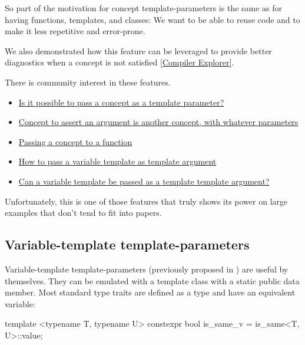\documentclass{wg21}
\begin{document}
So part of the motivation for concept template-parameters is the same as for having functions, templates, and classes:
We want to be able to reuse code and to make it less repetitive and error-prone.


We also demonstrated how this feature can be leveraged to provide better diagnostics when a concept is not satisfied \href{https://compiler-explorer.com/z/sPz5faEbP}{[Compiler Explorer]}.


There is community interest in these features.
\begin{itemize}
\item \href{https://stackoverflow.com/questions/63098070/is-it-possible-to-pass-a-concept-as-a-template-parameter}{Is it possible to pass a concept as a template parameter?}
\item \href{https://stackoverflow.com/questions/72488554/concept-to-assert-an-argument-is-another-concept-with-whatever-parameters}{Concept to assert an argument is another concept, with whatever parameters}
\item \href{https://stackoverflow.com/questions/58875829/passing-a-concept-to-a-function}{Passing a concept to a function}
\item \href{https://stackoverflow.com/questions/61664468/how-to-pass-a-variable-template-as-template-argument}{How to pass a variable template as template argument}
\item \href{https://stackoverflow.com/questions/58592312/can-a-variable-template-be-passed-as-a-template-template-argument}{Can a variable template be passed as a template template argument?}
\end{itemize}

Unfortunately, this is one of those features that truly shows its power on large examples that don't tend to fit into papers.

\subsection{Variable-template template-parameters}

Variable-template template-parameters (previously proposed in ) are useful by themselves.
They can be emulated with a template class with a static public  data member.
Most standard type traits are defined as a type and have an equivalent  variable:

\begin{colorblock}
template <typename T, typename U>
constexpr bool is_same_v = is_same<T, U>::value;
\end{colorblock}
\end{document}
